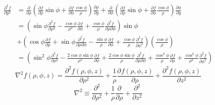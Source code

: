 \begin{equation}
    \begin{split}
        \frac{\partial^{2}{f}}{\partial{y}^{2}} &= \frac{\partial}{\partial{\rho}} \left( \frac{\partial{f}}{\partial{\rho}} \sin{\phi} + \frac{\partial{f}}{\partial{\phi}} \frac{\cos{\phi}}{\rho} \right) \frac{\partial{\rho}}{\partial{y}} + \frac{\partial}{\partial{\phi}} \left( \frac{\partial{f}}{\partial{\rho}} \sin{\phi} + \frac{\partial{f}}{\partial{\phi}} \frac{\cos{\phi}}{\rho} \right) \frac{\partial{\phi}}{\partial{y}} \\
        &= \left( \sin{\phi} \frac{\partial^{2}{f}}{\partial{\rho}^{2}} - \frac{\cos{\phi}}{\rho^{2}} \frac{\partial^{}{f}}{\partial{\phi}^{}} + \frac{\cos{\phi}}{\rho} \frac{\partial^{2}{f}}{\partial{\rho}\partial{\phi}} \right) \sin{\phi} \\
        &+ \left( \cos{\phi} \frac{\partial^{}{f}}{\partial{\rho}^{}} + \sin{\phi} \frac{\partial^{2}{f}}{\partial{\rho}\partial{\phi}} - \frac{\sin{\phi}}{\rho} \frac{\partial^{}{f}}{\partial{\phi}^{}} + \frac{\cos{\phi}}{\rho} \frac{\partial^{2}{f}}{\partial{\phi}^{2}} \right) \left( \frac{\cos{\phi}}{\rho} \right) \\
        &= \left( \sin^{2}{\phi} \frac{\partial^{2}{f}}{\partial{\rho}^{2}} - \frac{2 \cos{\phi} \sin{\phi}}{\rho^{2}} \frac{\partial^{}{f}}{\partial{\phi}^{}} + \frac{2 \cos{\phi} \sin{\phi}}{\rho} \frac{\partial^{2}{f}}{\partial{\rho}\partial{\phi}} + \frac{\cos^{2}{\phi}}{\rho} \frac{\partial^{}{f}}{\partial{\rho}^{}} + \frac{\cos^{2}{\phi}}{\rho^{2}} \frac{\partial^{2}{f}}{\partial{\phi}^{2}} \right)
    \end{split}
\end{equation}
\begin{equation}
    \nabla^{2} f(\rho,\phi,z) = \frac{\partial^{2}{f(\rho,\phi,z)}}{\partial{\rho}^{2}} + \frac{1}{\rho} \frac{\partial^{}{f(\rho,\phi,z)}}{\partial{\rho}^{}} + \frac{\partial^{2}{f(\rho,\phi,z)}}{\partial{z}^{2}}
\end{equation}
\begin{equation}
    \nabla^{2} \equiv \frac{\partial^{2}{}}{\partial{\rho}^{2}} + \frac{1}{\rho} \frac{\partial^{}{}}{\partial{\rho}^{}} + \frac{\partial^{2}{}}{\partial{z}^{2}}
\end{equation}
